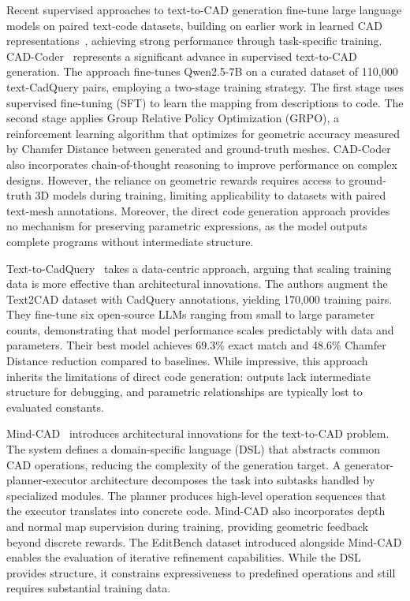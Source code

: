 \documentclass[5p,twocolumn,10pt,times]{elsarticle}
\begin{document}
Recent supervised approaches to text-to-CAD generation fine-tune large language models on paired text-code datasets, building on earlier work in learned CAD representations~\cite{wu2021deepcad}, achieving strong performance through task-specific training. CAD-Coder~\cite{cadcoder2025} represents a significant advance in supervised text-to-CAD generation. The approach fine-tunes Qwen2.5-7B on a curated dataset of 110,000 text-CadQuery pairs, employing a two-stage training strategy. The first stage uses supervised fine-tuning (SFT) to learn the mapping from descriptions to code. The second stage applies Group Relative Policy Optimization (GRPO), a reinforcement learning algorithm that optimizes for geometric accuracy measured by Chamfer Distance between generated and ground-truth meshes. CAD-Coder also incorporates chain-of-thought reasoning to improve performance on complex designs. However, the reliance on geometric rewards requires access to ground-truth 3D models during training, limiting applicability to datasets with paired text-mesh annotations. Moreover, the direct code generation approach provides no mechanism for preserving parametric expressions, as the model outputs complete programs without intermediate structure.

Text-to-CadQuery~\cite{text2cadquery2025} takes a data-centric approach, arguing that scaling training data is more effective than architectural innovations. The authors augment the Text2CAD dataset with CadQuery annotations, yielding 170,000 training pairs. They fine-tune six open-source LLMs ranging from small to large parameter counts, demonstrating that model performance scales predictably with data and parameters. Their best model achieves 69.3\% exact match and 48.6\% Chamfer Distance reduction compared to baselines. While impressive, this approach inherits the limitations of direct code generation: outputs lack intermediate structure for debugging, and parametric relationships are typically lost to evaluated constants.

Mind-CAD~\cite{mindcad2025} introduces architectural innovations for the text-to-CAD problem. The system defines a domain-specific language (DSL) that abstracts common CAD operations, reducing the complexity of the generation target. A generator-planner-executor architecture decomposes the task into subtasks handled by specialized modules. The planner produces high-level operation sequences that the executor translates into concrete code. Mind-CAD also incorporates depth and normal map supervision during training, providing geometric feedback beyond discrete rewards. The EditBench dataset introduced alongside Mind-CAD enables the evaluation of iterative refinement capabilities. While the DSL provides structure, it constrains expressiveness to predefined operations and still requires substantial training data.
\end{document}
